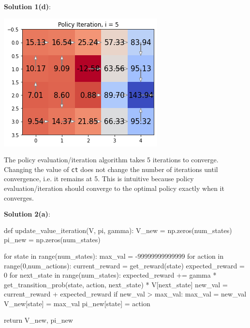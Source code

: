 \documentclass[submit]{harvardml}
\begin{document}
\textbf{Solution 1(d)}:\\
\begin{center}
    \includegraphics[width=0.5\linewidth]{HW6/plots/1d.ct=0.01.png}
\end{center}
The policy evaluation/iteration algorithm takes 5 iterations to converge. Changing the value of \texttt{ct} does not change the number of iterations until convergence, i.e. it remains at 5. This is intuitive because policy evaluation/iteration should converge to the optimal policy exactly when it converges.
\bigskip

\textbf{Solution 2(a)}:\\
\begin{python}
    def update_value_iteration(V, pi, gamma):
    V_new = np.zeros(num_states)
    pi_new = np.zeros(num_states)

    for state in range(num_states):
        max_val = -99999999999999
        for action in range(0,num_actions):
            current_reward = get_reward(state)
            expected_reward = 0
            for next_state in range(num_states):
                expected_reward += gamma * get_transition_prob(state, action, next_state) * V[next_state]
            new_val = current_reward + expected_reward
            if new_val > max_val:
                max_val = new_val
                V_new[state] = max_val
                pi_new[state] = action

    return V_new, pi_new
\end{python}
\newpage
\end{document}

